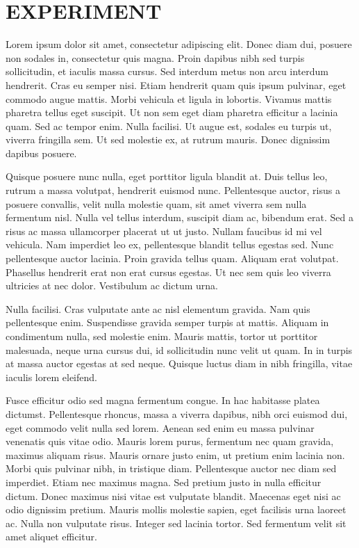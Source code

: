 \renewcommand{\chaptername}{}

\chapter{EXPERIMENT}

Lorem ipsum dolor sit amet, consectetur adipiscing elit. Donec diam dui, posuere non sodales in, consectetur quis magna. Proin dapibus nibh sed turpis sollicitudin, et iaculis massa cursus. Sed interdum metus non arcu interdum hendrerit. Cras eu semper nisi. Etiam hendrerit quam quis ipsum pulvinar, eget commodo augue mattis. Morbi vehicula et ligula in lobortis. Vivamus mattis pharetra tellus eget suscipit. Ut non sem eget diam pharetra efficitur a lacinia quam. Sed ac tempor enim. Nulla facilisi. Ut augue est, sodales eu turpis ut, viverra fringilla sem. Ut sed molestie ex, at rutrum mauris. Donec dignissim dapibus posuere.

Quisque posuere nunc nulla, eget porttitor ligula blandit at. Duis tellus leo, rutrum a massa volutpat, hendrerit euismod nunc. Pellentesque auctor, risus a posuere convallis, velit nulla molestie quam, sit amet viverra sem nulla fermentum nisl. Nulla vel tellus interdum, suscipit diam ac, bibendum erat. Sed a risus ac massa ullamcorper placerat ut ut justo. Nullam faucibus id mi vel vehicula. Nam imperdiet leo ex, pellentesque blandit tellus egestas sed. Nunc pellentesque auctor lacinia. Proin gravida tellus quam. Aliquam erat volutpat. Phasellus hendrerit erat non erat cursus egestas. Ut nec sem quis leo viverra ultricies at nec dolor. Vestibulum ac dictum urna.

Nulla facilisi. Cras vulputate ante ac nisl elementum gravida. Nam quis pellentesque enim. Suspendisse gravida semper turpis at mattis. Aliquam in condimentum nulla, sed molestie enim. Mauris mattis, tortor ut porttitor malesuada, neque urna cursus dui, id sollicitudin nunc velit ut quam. In in turpis at massa auctor egestas at sed neque. Quisque luctus diam in nibh fringilla, vitae iaculis lorem eleifend.  \cite{IEEEexample:book}

Fusce efficitur odio sed magna fermentum congue. In hac habitasse platea dictumst. Pellentesque rhoncus, massa a viverra dapibus, nibh orci euismod dui, eget commodo velit nulla sed lorem. Aenean sed enim eu massa pulvinar venenatis quis vitae odio. Mauris lorem purus, fermentum nec quam gravida, maximus aliquam risus. Mauris ornare justo enim, ut pretium enim lacinia non. Morbi quis pulvinar nibh, in tristique diam. Pellentesque auctor nec diam sed imperdiet. Etiam nec maximus magna. Sed pretium justo in nulla efficitur dictum. Donec maximus nisi vitae est vulputate blandit. Maecenas eget nisi ac odio dignissim pretium. Mauris mollis molestie sapien, eget facilisis urna laoreet ac. Nulla non vulputate risus. Integer sed lacinia tortor. Sed fermentum velit sit amet aliquet efficitur.

